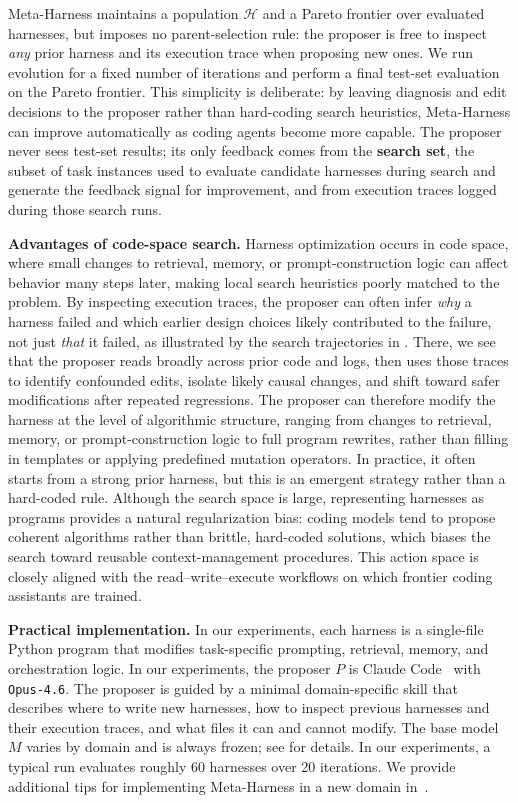 \documentclass{article}
\begin{document}
Meta-Harness maintains a population $\mathcal{H}$ and a Pareto frontier over evaluated harnesses, but imposes no parent-selection rule: the proposer is free to inspect \textit{any} prior harness and its execution trace when proposing new ones.
We run evolution for a fixed number of iterations and perform a final test-set evaluation on the Pareto frontier. This simplicity is deliberate: by leaving diagnosis and edit decisions to the proposer rather than hard-coding search heuristics, Meta-Harness can improve automatically as coding agents become more capable.
The proposer never sees test-set results; its only feedback comes from the \textbf{search set}, the subset of task instances used to evaluate candidate harnesses during search and generate the feedback signal for improvement, and from execution traces logged during those search runs.

\textbf{Advantages of code-space search.}
Harness optimization occurs in code space, where small changes to retrieval, memory, or prompt-construction logic can affect behavior many steps later, making local search heuristics poorly matched to the problem.
By inspecting execution traces, the proposer can often infer \emph{why} a harness failed and which earlier design choices likely contributed to the failure, not just \emph{that} it failed, as illustrated by the search trajectories in . There, we see that the proposer reads broadly across prior code and logs, then uses those traces to identify confounded edits, isolate likely causal changes, and shift toward safer modifications after repeated regressions.
The proposer can therefore modify the harness at the level of algorithmic structure, ranging from changes to retrieval, memory, or prompt-construction logic to full program rewrites, rather than filling in templates or applying predefined mutation operators.
In practice, it often starts from a strong prior harness, but this is an emergent strategy rather than a hard-coded rule.
Although the search space is large, representing harnesses as programs provides a natural regularization bias: coding models tend to propose coherent algorithms rather than brittle, hard-coded solutions, which biases the search toward reusable context-management procedures.
This action space is closely aligned with the read--write--execute workflows on which frontier coding assistants are trained.

\textbf{Practical implementation.}
In our experiments, each harness is a single-file Python program that modifies task-specific prompting, retrieval, memory, and orchestration logic.
In our experiments, the proposer $P$ is Claude Code~\citep{anthropic2025claudecode} with \texttt{Opus-4.6}.
The proposer is guided by a minimal domain-specific skill that describes where to write new harnesses, how to inspect previous harnesses and their execution traces, and what files it can and cannot modify.
The base model $M$ varies by domain and is always frozen; see  for details.
In our experiments, a typical run evaluates roughly 60 harnesses over 20 iterations.
We provide additional tips for implementing Meta-Harness in a new domain in~.
\end{document}
